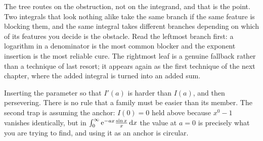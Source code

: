 \begin{center}
\end{center}

The tree routes on the obstruction, not on the integrand, and that is the point. Two integrals that look nothing alike take the same branch if the same feature is blocking them, and the same integral takes different branches depending on which of its features you decide is the obstacle. Read the leftmost branch first: a logarithm in a denominator is the most common blocker and the exponent insertion is the most reliable cure. The rightmost leaf is a genuine fallback rather than a technique of last resort; it appears again as the first technique of the next chapter, where the added integral is turned into an added sum.

\begin{trap}
Inserting the parameter so that $I'(a)$ is harder than $I(a)$, and then persevering. There is no rule that a family must be easier than its member. The second trap is assuming the anchor: $I(0)=0$ held above because $x^{0}-1$ vanishes identically, but in $\int_0^\infty \mathrm{e}^{-ax}\frac{\sin x}{x}\,\mathrm{d} x$ the value at $a=0$ is precisely what you are trying to find, and using it as an anchor is circular.
\end{trap}

